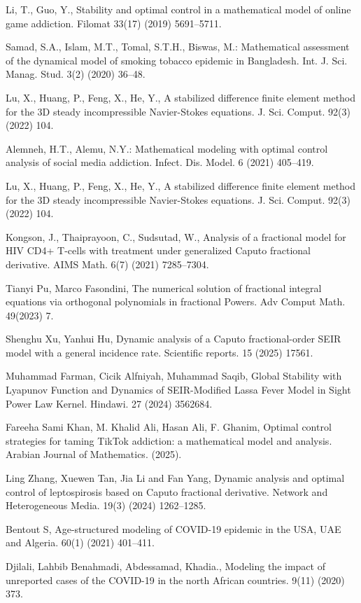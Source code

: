 \documentclass[10pt]{NSP1}
\begin{document}
Li, T., Guo, Y., Stability and optimal control in a mathematical model of online game addiction. Filomat 33(17) (2019) 5691–5711.

Samad, S.A., Islam, M.T., Tomal, S.T.H., Biswas, M.: Mathematical assessment of the dynamical model of smoking tobacco epidemic in Bangladesh. Int. J. Sci. Manag. Stud. 3(2) (2020) 36–48.

Lu, X., Huang, P., Feng, X., He, Y., A stabilized difference finite element method for the 3D steady incompressible Navier-Stokes equations. J. Sci. Comput. 92(3) (2022) 104.

Alemneh, H.T., Alemu, N.Y.: Mathematical modeling with optimal control analysis of social media addiction. Infect. Dis. Model. 6 (2021) 405–419.

Lu, X., Huang, P., Feng, X., He, Y., A stabilized difference finite element method for the 3D steady incompressible Navier-Stokes equations. J. Sci. Comput. 92(3) (2022) 104.

Kongson, J., Thaiprayoon, C., Sudsutad, W., Analysis of a fractional model for HIV CD4+ T-cells with treatment under generalized Caputo fractional derivative. AIMS Math. 6(7) (2021) 7285–7304.

Tianyi Pu, Marco Fasondini, The numerical solution of fractional integral equations via orthogonal polynomials in fractional Powers. Adv Comput Math. 49(2023) 7.

Shenghu Xu, Yanhui Hu, Dynamic analysis of a Caputo fractional-order SEIR model with a general incidence rate. Scientific reports. 15 (2025) 17561.

Muhammad Farman, Cicik Alfniyah, Muhammad Saqib, Global Stability with Lyapunov Function and Dynamics of SEIR-Modified Lassa Fever Model in Sight Power Law Kernel. Hindawi. 27 (2024) 3562684.

Fareeha Sami Khan, M. Khalid Ali, Hasan Ali, F. Ghanim, Optimal control strategies for taming TikTok addiction: a mathematical model and analysis. Arabian Journal of Mathematics. (2025).

Ling Zhang, Xuewen Tan, Jia Li and Fan Yang, Dynamic analysis and optimal control of leptospirosis based on Caputo fractional derivative. Network and Heterogeneous Media. 19(3) (2024) 1262–1285.

Bentout S, Age-structured modeling of COVID-19 epidemic in the USA, UAE and Algeria. 60(1) (2021) 401–411.

Djilali, Lahbib Benahmadi, Abdessamad, Khadia., Modeling the impact of unreported cases of the COVID-19 in the north African countries. 9(11) (2020) 373.
\end{document}
